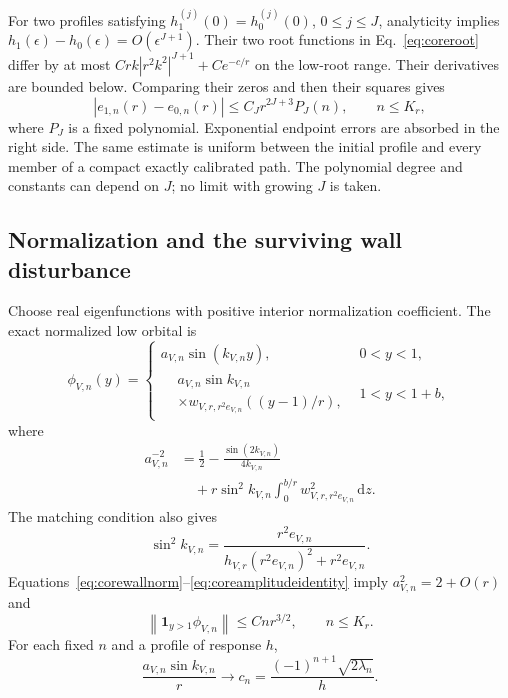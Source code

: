 \documentclass[aps,pra,reprint,superscriptaddress,longbibliography]{revtex4-2}
\newcommand{\dd}{\mathrm d}
\newcommand{\norm}[1]{\left\lVert#1\right\rVert}
\begin{document}
For two profiles satisfying
$h_1^{(j)}(0)=h_0^{(j)}(0)$, $0\le j\le J$, analyticity implies
$h_1(\epsilon)-h_0(\epsilon)=O(\epsilon^{J+1})$. Their two root
functions in Eq.~\eqref{eq:coreroot} differ by at most
$Crk|r^2k^2|^{J+1}+Ce^{-c/r}$ on the low-root range. Their derivatives
are bounded below. Comparing their zeros and then their squares gives
\begin{equation}
 |e_{1,n}(r)-e_{0,n}(r)|
       \le C_Jr^{2J+3}P_J(n),\qquad n\le K_r,
 \label{eq:corematchedroots}
\end{equation}
where $P_J$ is a fixed polynomial. Exponential endpoint errors are absorbed
in the right side. The same estimate is uniform between the initial
profile and every member of a compact exactly calibrated path. The
polynomial degree and constants can depend on $J$; no limit with growing
$J$ is taken.

\subsection{Normalization and the surviving wall disturbance}

Choose real eigenfunctions with positive interior normalization coefficient.
The exact normalized low orbital is
\begin{equation}
 \phi_{V,n}(y)=
 \begin{cases}
 a_{V,n}\sin(k_{V,n}y),&0<y<1,\\
  \begin{aligned} &a_{V,n}\sin k_{V,n}\,\\[-2pt]
  &\times w_{V,r,r^2e_{V,n}}((y-1)/r),\end{aligned}&1<y<1+b,
 \end{cases}
 \label{eq:coreorbital}
\end{equation}
where
\begin{align}
 a_{V,n}^{-2}
 &=\frac12-\frac{\sin(2k_{V,n})}{4k_{V,n}}\nonumber\\
 &\quad+r\sin^2 k_{V,n}
            \int_0^{b/r}w_{V,r,r^2e_{V,n}}^2\,\dd z.
 \label{eq:corenormalization}
\end{align}
The matching condition also gives
\begin{equation}
 \sin^2 k_{V,n}
     =\frac{r^2e_{V,n}}
             {h_{V,r}(r^2e_{V,n})^2+r^2e_{V,n}}.
 \label{eq:coreamplitudeidentity}
\end{equation}
Equations~\eqref{eq:corewallnorm}--\eqref{eq:coreamplitudeidentity} imply
$a_{V,n}^2=2+O(r)$ and
\begin{equation}
 \norm{\mathbf1_{y>1}\phi_{V,n}}\le Cnr^{3/2},
 \qquad n\le K_r.
 \label{eq:corewallpopulation}
\end{equation}
For each fixed $n$ and a profile of response $h$,
\begin{equation}
 \frac{a_{V,n}\sin k_{V,n}}r\longrightarrow
 c_n=\frac{(-1)^{n+1}\sqrt{2\lambda_n}}h.
 \label{eq:coreamplitudelimit}
\end{equation}
\end{document}
